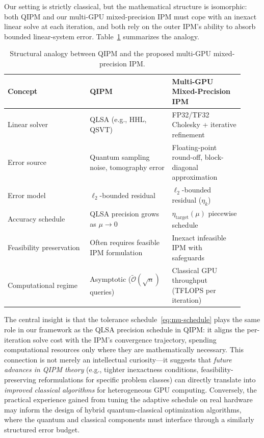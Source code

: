 \documentclass[11pt,twoside]{article}
\newcommand{\cO}{\mathcal{O}}
\begin{document}
Our setting is strictly classical, but the mathematical structure is
isomorphic: both QIPM and our multi-GPU mixed-precision IPM must cope with
an inexact linear solve at each iteration, and both rely on the outer IPM's
ability to absorb bounded linear-system error.  Table~\ref{tab:qipm-analogy}
summarizes the analogy.

\begin{table}[t]
  \centering
  \caption{Structural analogy between QIPM and the proposed multi-GPU
           mixed-precision IPM.}
  \label{tab:qipm-analogy}
  \begin{tabular}{@{}p{0.32\linewidth} p{0.32\linewidth} p{0.28\linewidth}@{}}
    \toprule
    \textbf{Concept} & \textbf{QIPM} & \textbf{Multi-GPU Mixed-Precision IPM} \\
    \midrule
    Linear solver
      & QLSA (e.g., HHL, QSVT)
      & FP32/TF32 Cholesky + iterative refinement \\
    Error source
      & Quantum sampling noise, tomography error
      & Floating-point round-off, block-diagonal approximation \\
    Error model
      & $\ell_2$-bounded residual
      & $\ell_2$-bounded residual ($\eta_k$) \\
    Accuracy schedule
      & QLSA precision grows as $\mu \to 0$
      & $\eta_{\text{target}}(\mu)$ piecewise schedule \\
    Feasibility preservation
      & Often requires feasible IPM formulation
      & Inexact infeasible IPM with safeguards \\
    Computational regime
      & Asymptotic ($\widetilde{\cO}(\sqrt{n})$ queries)
      & Classical GPU throughput (TFLOPS per iteration) \\
    \bottomrule
  \end{tabular}
\end{table}

The central insight is that the tolerance schedule~\eqref{eq:mu-schedule}
plays the same role in our framework as the QLSA precision schedule in
QIPM: it aligns the per-iteration solve cost with the IPM's convergence
trajectory, spending computational resources only where they are
mathematically necessary.  This connection is not merely an intellectual
curiosity---it suggests that \emph{future advances in QIPM theory} (e.g.,
tighter inexactness conditions, feasibility-preserving reformulations for
specific problem classes) can directly translate into \emph{improved
classical algorithms} for heterogeneous GPU computing.  Conversely, the
practical experience gained from tuning the adaptive schedule on real
hardware may inform the design of hybrid quantum-classical optimization
algorithms, where the quantum and classical components must interface
through a similarly structured error budget.
\end{document}

